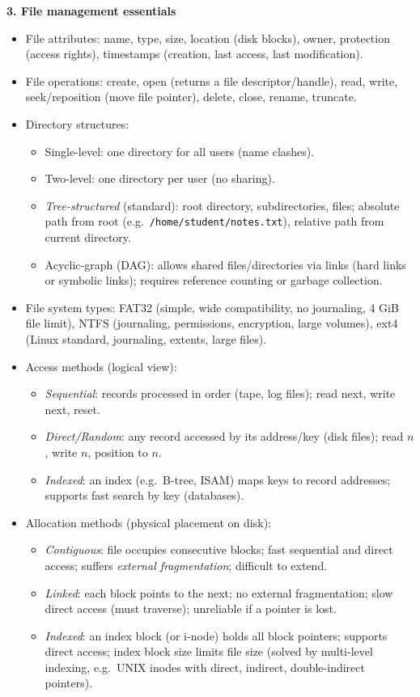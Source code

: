 \documentclass[11pt]{article}
\newcommand{\cle}[1]{{\popxbold\color{popdark}#1}}
\begin{document}
\begin{bilan}
\textbf{3. File management essentials}
\begin{itemize}
\item \cle{File attributes}: name, type, size, location (disk blocks), owner, protection (access rights), timestamps (creation, last access, last modification).
\item \cle{File operations}: create, open (returns a file descriptor/handle), read, write, seek/reposition (move file pointer), delete, close, rename, truncate.
\item \cle{Directory structures}:
  \begin{itemize}
  \item Single-level: one directory for all users (name clashes).
  \item Two-level: one directory per user (no sharing).
  \item \emph{Tree-structured} (standard): root directory, subdirectories, files; absolute path from root (e.g.\ \texttt{/home/student/notes.txt}), relative path from current directory.
  \item Acyclic-graph (DAG): allows shared files/directories via links (hard links or symbolic links); requires reference counting or garbage collection.
  \end{itemize}
\item \cle{File system types}: FAT32 (simple, wide compatibility, no journaling, 4 GiB file limit), NTFS (journaling, permissions, encryption, large volumes), ext4 (Linux standard, journaling, extents, large files).
\item \cle{Access methods} (logical view):
  \begin{itemize}
  \item \emph{Sequential}: records processed in order (tape, log files); read next, write next, reset.
  \item \emph{Direct/Random}: any record accessed by its address/key (disk files); read $n$, write $n$, position to $n$.
  \item \emph{Indexed}: an index (e.g.\ B-tree, ISAM) maps keys to record addresses; supports fast search by key (databases).
  \end{itemize}
\item \cle{Allocation methods} (physical placement on disk):
  \begin{itemize}
  \item \emph{Contiguous}: file occupies consecutive blocks; fast sequential and direct access; suffers \emph{external fragmentation}; difficult to extend.
  \item \emph{Linked}: each block points to the next; no external fragmentation; slow direct access (must traverse); unreliable if a pointer is lost.
  \item \emph{Indexed}: an index block (or i-node) holds all block pointers; supports direct access; index block size limits file size (solved by multi-level indexing, e.g.\ UNIX inodes with direct, indirect, double-indirect pointers).
  \end{itemize}
\end{itemize}


\end{bilan}
\end{document}
